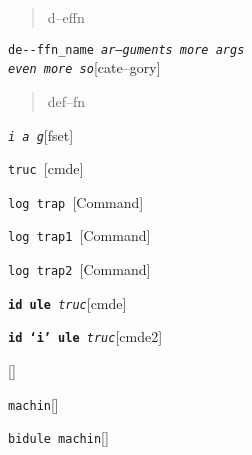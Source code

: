 \documentclass{book}
\newcommand\GNUTexinfocommandstyletextvar[1]{{\normalfont{}\textsl{#1}}}%
\begin{document}
\begin{titlepage}
%
\begin{quote}
\unskip{\parskip=0pt\noindent}%
d--effn
\end{quote}

\noindent\texttt{de{-}{-}ffn\_name \EmbracOn{}\textnormal{\textsl{ar--guments    more args \leavevmode{}\\ even more so}}\EmbracOff{}}\hfill[cate--gory]



%
\begin{quote}
\unskip{\parskip=0pt\noindent}%
def--fn
\end{quote}

\noindent\texttt{\GNUTexinfocommandstyletextvar{i} \EmbracOn{}\textnormal{\textsl{a g}}\EmbracOff{}}\hfill[fset]



\index[fn]{i@\texttt{\GNUTexinfocommandstyletextvar{i}}}%
%
\noindent\texttt{truc \EmbracOn{}\textnormal{\textsl{}}\EmbracOff{}}\hfill[cmde]



%
\noindent\texttt{log trap \EmbracOn{}\textnormal{\textsl{}}\EmbracOff{}}\hfill[Command]



%
\noindent\texttt{log trap1 \EmbracOn{}\textnormal{\textsl{}}\EmbracOff{}}\hfill[Command]



%
\noindent\texttt{log trap2 \EmbracOn{}\textnormal{\textsl{}}\EmbracOff{}}\hfill[Command]



%
\noindent\texttt{\textbf{id ule} \EmbracOn{}\textnormal{\textsl{truc}}\EmbracOff{}}\hfill[cmde]



%
\noindent\texttt{\textbf{id `\texttt{i}' ule} \EmbracOn{}\textnormal{\textsl{truc}}\EmbracOff{}}\hfill[cmde2]



%
\noindent\texttt{}\hfill[]



\noindent\texttt{machin}\hfill[]



%
\noindent\texttt{bidule machin}\hfill[]




\end{titlepage}
\end{document}

